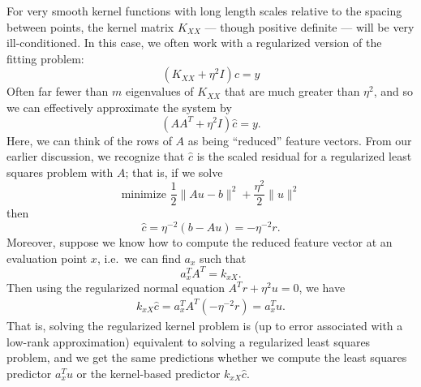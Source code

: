 \documentclass[12pt, leqno]{article} %
\begin{document}
For very smooth kernel functions with long length scales relative
to the spacing between points, the kernel matrix $K_{XX}$ --- though
positive definite --- will be very ill-conditioned.  In this case,
we often work with a regularized version of the fitting problem:
\[
  (K_{XX} + \eta^2 I) c = y
\]
Often far fewer than $m$ eigenvalues of $K_{XX}$ that are much greater
than $\eta^2$, and so we can effectively approximate the system by
\[
  (AA^T + \eta^2 I) \hat{c} = y.
\]
Here, we can think of the rows of $A$ as being ``reduced'' feature
vectors.  From our earlier discussion, we recognize that $\hat{c}$
is the scaled residual for a regularized least squares problem with
$A$; that is, if we solve
\[
  \mbox{minimize } \frac{1}{2} \|Au-b\|^2 + \frac{\eta^2}{2} \|u\|^2
\]
then  
\[
  \hat{c} = \eta^{-2} (b-Au) = -\eta^{-2} r.
\]
Moreover, suppose we know how to compute the reduced feature vector
at an evaluation point $x$, i.e.~we can find $a_x$ such that
\[
  a_x^T A^T = k_{xX}.
\]
Then using the regularized normal equation $A^T r + \eta^2 u = 0$, we have
\begin{align*}
  k_{xX} \hat{c} = a_x^T A^T (-\eta^{-2} r) = a_x^T u.
\end{align*}
That is, solving the regularized kernel problem is (up to error
associated with a low-rank approximation) equivalent to
solving a regularized least squares problem, and we get the same
predictions whether we compute the least squares predictor $a_x^T u$
or the kernel-based predictor $k_{xX} \hat{c}$.
\end{document}

